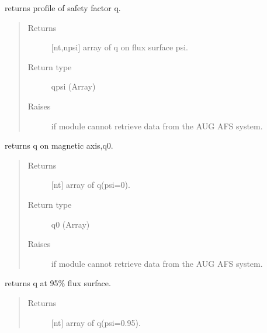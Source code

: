 \documentclass[letterpaper,10pt,english]{sphinxmanual}
\begin{document}
\begin{fulllineitems}
\begin{fulllineitems}
\label{\detokenize{eqtools:eqtools.AUGData.AUGDDData.getQProfile}}
returns profile of safety factor q.
\begin{quote}\begin{description}
\item[{Returns}] \leavevmode
{[}nt,npsi{]} array of q on flux surface psi.

\item[{Return type}] \leavevmode
qpsi (Array)

\item[{Raises}] \leavevmode
{} \textendash{} if module cannot retrieve data from the AUG AFS system.

\end{description}\end{quote}

\end{fulllineitems}


\begin{fulllineitems}
\label{\detokenize{eqtools:eqtools.AUGData.AUGDDData.getQ0}}
returns q on magnetic axis,q0.
\begin{quote}\begin{description}
\item[{Returns}] \leavevmode
{[}nt{]} array of q(psi=0).

\item[{Return type}] \leavevmode
q0 (Array)

\item[{Raises}] \leavevmode
{} \textendash{} if module cannot retrieve data from the AUG AFS system.

\end{description}\end{quote}

\end{fulllineitems}


\begin{fulllineitems}
\label{\detokenize{eqtools:eqtools.AUGData.AUGDDData.getQ95}}
returns q at 95\% flux surface.
\begin{quote}\begin{description}
\item[{Returns}] \leavevmode
{[}nt{]} array of q(psi=0.95).


\end{description}
\end{quote}
\end{fulllineitems}
\end{fulllineitems}
\end{document}
